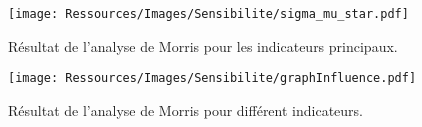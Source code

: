 \begin{landscape}
    \begin{figure}
        \begin{center}
            \texttt{[image: Ressources/Images/Sensibilite/sigma\_mu\_star.pdf]}
        \end{center}
        \caption{Résultat de l’analyse de Morris pour les indicateurs principaux.
                 \label{fig:sigma_mu_star}}
    \end{figure}

    \begin{figure}
      \begin{center}
          \texttt{[image: Ressources/Images/Sensibilite/graphInfluence.pdf]}
      \end{center}
      \caption{Résultat de l’analyse de Morris pour différent indicateurs.
               \label{fig:graphe_influence}}
  \end{figure}
\end{landscape}

